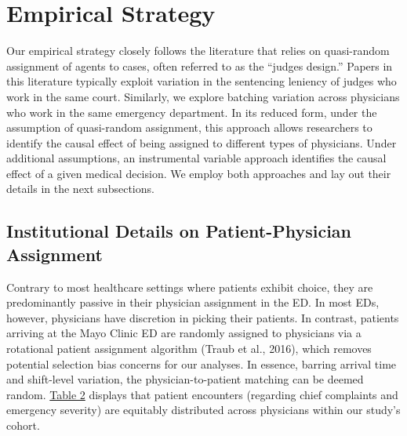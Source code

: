 \documentclass[,,nonblindrev]{informs}
\begin{document}
\hypertarget{sec:3}{%
\section{Empirical Strategy}\label{sec:3}}

Our empirical strategy closely follows the literature that relies on
quasi-random assignment of agents to cases, often referred to as the
``judges design.'' Papers in this literature typically exploit variation
in the sentencing leniency of judges who work in the same court.
Similarly, we explore batching variation across physicians who work in
the same emergency department. In its reduced form, under the assumption
of quasi-random assignment, this approach allows researchers to identify
the causal effect of being assigned to different types of physicians.
Under additional assumptions, an instrumental variable approach
identifies the causal effect of a given medical decision. We employ both
approaches and lay out their details in the next subsections.

\hypertarget{institutional-details-on-patient-physician-assignment}{%
\subsection{Institutional Details on Patient-Physician
Assignment}\label{institutional-details-on-patient-physician-assignment}}

Contrary to most healthcare settings where patients exhibit choice, they
are predominantly passive in their physician assignment in the ED. In
most EDs, however, physicians have discretion in picking their patients.
In contrast, patients arriving at the Mayo Clinic ED are randomly
assigned to physicians via a rotational patient assignment algorithm
(Traub et al., 2016), which removes potential selection bias concerns
for our analyses. In essence, barring arrival time and shift-level
variation, the physician-to-patient matching can be deemed random.
\hyperref[tab:summary_statistics]{Table 2} displays that patient
encounters (regarding chief complaints and emergency severity) are
equitably distributed across physicians within our study's cohort.
\end{document}
